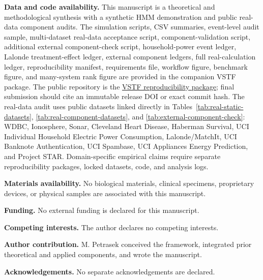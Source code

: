 \documentclass[11pt,a4paper]{article}
\newcommand{\1}{\mathbf{1}}
\begin{document}
\begin{sloppypar}
\textbf{Data and code availability.} This manuscript is a theoretical and methodological synthesis with a synthetic HMM demonstration and public real-data component audits. The simulation scripts, CSV summaries, event-level audit sample, multi-dataset real-data acceptance script, component-validation script, additional external component-check script, household-power event ledger, Lalonde treatment-effect ledger, external component ledgers, full real-calculation ledger, reproducibility manifest, requirements file, workflow figure, benchmark figure, and many-system rank figure are provided in the companion VSTF package. The public repository is the \href{https://github.com/MartinPetrasek123/R_Universe_Evidence_Audited/tree/main/vstf}{VSTF reproducibility package}; final submission should cite an immutable release DOI or exact commit hash. The real-data audit uses public datasets linked directly in Tables~\ref{tab:real-static-datasets}, \ref{tab:real-component-datasets}, and \ref{tab:external-component-check}: WDBC, Ionosphere, Sonar, Cleveland Heart Disease, Haberman Survival, UCI Individual Household Electric Power Consumption, Lalonde/MatchIt, UCI Banknote Authentication, UCI Spambase, UCI Appliances Energy Prediction, and Project STAR. Domain-specific empirical claims require separate reproducibility packages, locked datasets, code, and analysis logs.
\end{sloppypar}

\textbf{Materials availability.} No biological materials, clinical specimens, proprietary devices, or physical samples are associated with this manuscript.

\textbf{Funding.} No external funding is declared for this manuscript.

\textbf{Competing interests.} The author declares no competing interests.

\textbf{Author contribution.} M. Petrasek conceived the framework, integrated prior theoretical and applied components, and wrote the manuscript.

\textbf{Acknowledgements.} No separate acknowledgements are declared.
\end{document}

